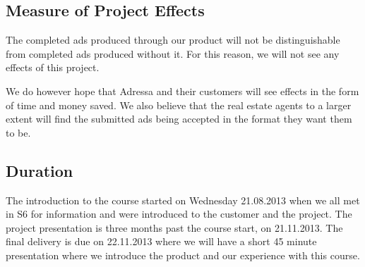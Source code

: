 \subsection{Measure of Project Effects}
The completed ads produced through our product will not be distinguishable from completed ads produced without it. For this reason, we will not see any effects of this project.

We do however hope that Adressa and their customers will see effects in the form of time and money saved. We also believe that the real estate agents to a larger extent will find the submitted ads being accepted in the format they want them to be.

\subsection{Duration}
The introduction to the course started on Wednesday 21.08.2013 when we all met in S6 for information and were introduced to the customer and the project.
The project presentation is three months past the course start, on 21.11.2013.
The final delivery is due on 22.11.2013 where we will have a short 45 minute presentation where we introduce the product and our experience with this course.